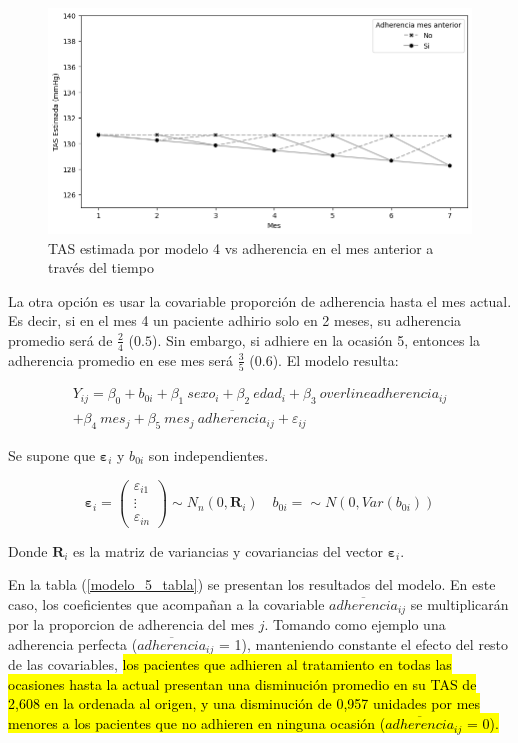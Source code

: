 \documentclass[spanish]{article}
\numberwithin{figure}{subsection}
\numberwithin{equation}{subsection}
\numberwithin{table}{subsection}
\begin{document}
\begin{figure}[H]
	\centering
	\includegraphics[scale=0.5]{img/modelo_4.png}
	\caption{TAS estimada por modelo 4 vs adherencia en el mes anterior a través del tiempo}
	\label{modelo_4_plot}
\end{figure}

La otra opción es usar la covariable proporción de adherencia hasta el mes
actual. Es decir, si en el mes 4 un paciente adhirio solo en 2 meses, su
adherencia promedio será de $\frac{2}{4}$ ($0.5$). Sin embargo, si adhiere en la
ocasión 5, entonces la adherencia promedio en ese mes será $\frac{3}{5}$
($0.6$). El modelo resulta:

\begin{multline}
	\label{modelo_5}
	Y_{ij} = \beta_0 + b_{0i} + \beta_1\ sexo_i + \beta_2\ edad_i + \beta_3\ overline{adherencia}_{ij} \\
	+ \beta_4\ mes_j + \beta_5\ mes_j\ \overline{adherencia}_{ij} + \varepsilon_{ij}
\end{multline}

Se supone que $\bm{\varepsilon}_i$ y $b_{0i}$ son independientes.

\[ 
	\bm{\varepsilon}_i = \begin{pmatrix} \varepsilon_{i1} \\ \vdots \\ \varepsilon_{in} \end{pmatrix} \sim N_{n}(0, \bm{R}_i)
	\quad
	b_{0i} = \sim N(0, Var(b_{0i}))
\]

Donde $\bm{R}_i$ es la matriz de variancias y covariancias del vector
$\bm{\varepsilon}_i$.

En la tabla (\ref{modelo_5_tabla}) se presentan los resultados del modelo. En este
caso, los coeficientes que acompañan a la covariable
$\overline{adherencia}_{ij}$ se multiplicarán por la proporcion de adherencia
del mes $j$. Tomando como ejemplo una adherencia perfecta
($\overline{adherencia}_{ij}$ = 1), manteniendo constante el efecto del resto de
las covariables, \hl{los pacientes que adhieren al tratamiento en todas las
ocasiones hasta la actual presentan una disminución promedio en su TAS de 2,608
en la ordenada al origen, y una disminución de 0,957 unidades por mes menores a
los pacientes que no adhieren en ninguna ocasión ($\overline{adherencia}_{ij}$ =
0).}
\end{document}
